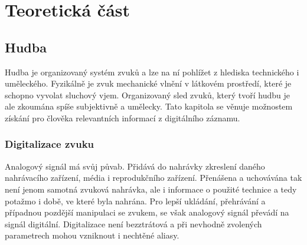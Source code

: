 \documentclass[thesis=B, czech]{FITthesis}[2019/03/06]
\begin{document}

\part{Teoretická část}

\chapter{Hudba}


Hudba je organizovaný systém zvuků a lze na ní pohlížet z hlediska technického i uměleckého. Fyzikálně je zvuk mechanické vlnění v látkovém prostředí, které je schopno vyvolat sluchový vjem. Organizovaný sled zvuků, který tvoří hudbu je ale zkoumána spíše subjektivně a umělecky. Tato kapitola se věnuje možnostem získání pro člověka relevantních informací z digitálního záznamu.




\section{Digitalizace zvuku}

Analogový signál má svůj půvab. Přidává do nahrávky zkreslení daného nahrávacího zařízení, média i reprodukčního zařízení. Přenášena a uchovávána tak není jenom samotná zvuková nahrávka, ale i informace o použité technice a tedy potažmo i době, ve které byla nahrána. Pro lepší ukládání, přehrávání a případnou pozdější manipulaci se zvukem, se však analogový signál  převádí na signál digitální. Digitalizace není bezztrátová a při nevhodně zvolených parametrech mohou vzniknout i nechtěné aliasy.
\end{document}
